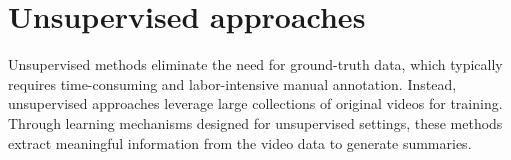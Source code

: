 \section{Unsupervised approaches}
\label{section:rel-unsupervised}

Unsupervised methods eliminate the need for ground-truth data, which typically requires time-consuming and labor-intensive manual annotation. Instead, unsupervised approaches leverage large collections of original videos for training. Through learning mechanisms designed for unsupervised settings, these methods extract meaningful information from the video data to generate summaries.





